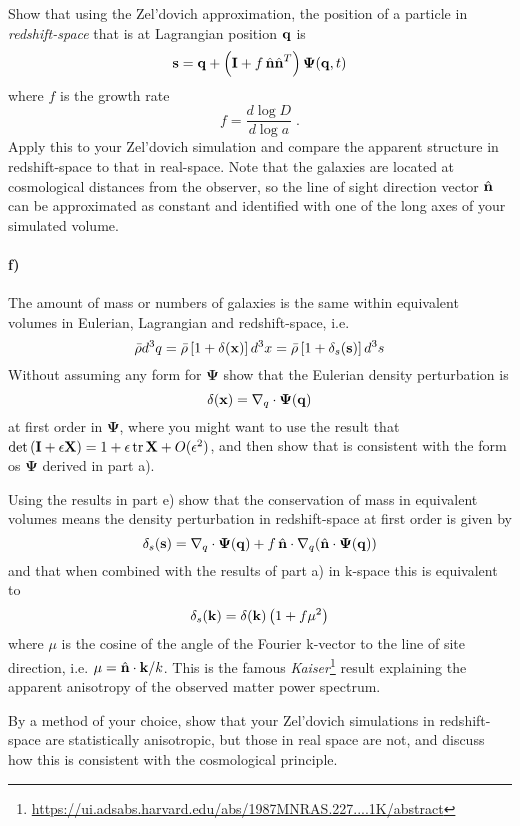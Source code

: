 \documentclass[12pt]{article}
\begin{document}
Show that using the Zel'dovich approximation, the position of a particle in \emph{redshift-space} that is at Lagrangian position ${\boldsymbol{\mathbf{q}}}$ is
\begin{equation}
{\boldsymbol{\mathbf{s}}} = {\boldsymbol{\mathbf{q}}} + \left(\mathbf{I} + f \, \hat{{\boldsymbol{\mathbf{n}}}} \hat{{\boldsymbol{\mathbf{n}}}}^T\right) \mathbf{\Psi}({\boldsymbol{\mathbf{q}}}, t)
\end{equation}
where $f$ is the growth rate
\begin{equation}
f = \frac{d \log D}{d \log a} \; .
\end{equation}
Apply this to your Zel'dovich simulation and compare the apparent structure in redshift-space to that in real-space. Note that the galaxies are located at cosmological distances from the observer, so the line of sight direction vector $\hat{{\boldsymbol{\mathbf{n}}}}$ can be approximated as constant and identified with one of the long axes of your simulated volume.

\paragraph{f)} The amount of mass or numbers of galaxies is the same within equivalent volumes in Eulerian, Lagrangian and redshift-space, i.e.
\begin{equation}
    \bar{\rho} d^3q = \bar{\rho} \left[ 1 + \delta({\boldsymbol{\mathbf{x}}})\right] d^3x = \bar{\rho} \left[ 1 + \delta_s({\boldsymbol{\mathbf{s}}})\right] d^3s
\end{equation}
Without assuming any form for $\mathbf{\Psi}$ show that the Eulerian density perturbation is
\begin{equation}
    \delta({\boldsymbol{\mathbf{x}}}) = \nabla_q \cdot \mathbf{\Psi}({\boldsymbol{\mathbf{q}}})
\end{equation}
at first order in $\mathbf{\Psi}$, where you might want to use the result that $\det{({\boldsymbol{\mathbf{I}}}+ \epsilon {\boldsymbol{\mathbf{X}}})} = 1 + \epsilon \operatorname{tr}{{\boldsymbol{\mathbf{X}}}} + O(\epsilon^2)$, and then show that is consistent with the form os $\mathbf{\Psi}$ derived in part a).

Using the results in part e) show that the conservation of mass in equivalent volumes means the density perturbation in redshift-space at first order is given by
\begin{equation}
    \delta_s({\boldsymbol{\mathbf{s}}}) = \nabla_q \cdot \mathbf{\Psi}({\boldsymbol{\mathbf{q}}}) + f \, \hat{{\boldsymbol{\mathbf{n}}}} \cdot \nabla_q (\hat{{\boldsymbol{\mathbf{n}}}} \cdot \mathbf{\Psi}({\boldsymbol{\mathbf{q}}}))
\end{equation}
and that when combined with the results of part a) in k-space this is equivalent to
\begin{equation}
    \delta_s({\boldsymbol{\mathbf{k}}}) = \delta({\boldsymbol{\mathbf{k}}}) \left( 1 + f \mu^2 \right)
\end{equation}
where $\mu$ is the cosine of the angle of the Fourier k-vector to the line of site direction, i.e. $\mu = \hat{{\boldsymbol{\mathbf{n}}}} \cdot {\boldsymbol{\mathbf{k}}} / k$. This is the famous \emph{Kaiser}\footnote{\url{https://ui.adsabs.harvard.edu/abs/1987MNRAS.227....1K/abstract}} result explaining the apparent anisotropy of the observed matter power spectrum.

By a method of your choice, show that your Zel'dovich simulations in redshift-space are statistically anisotropic, but those in real space are not, and discuss how this is consistent with the cosmological principle.
\end{document}
